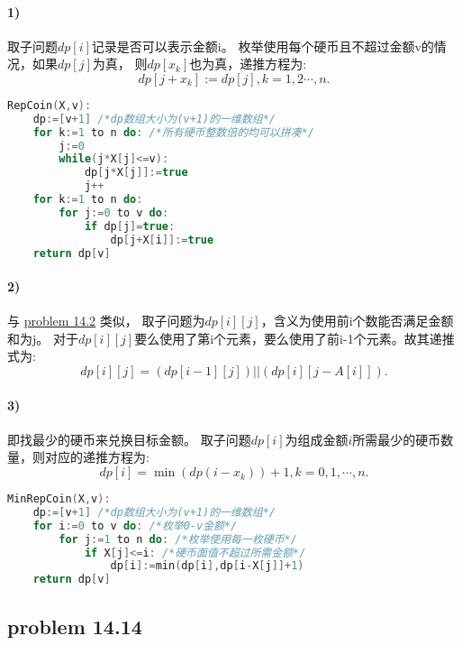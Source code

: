 \documentclass[11pt,a4paper,oneside,oldfontcommands]{ctexart}
\begin{document}
\paragraph*{1)}取子问题$dp[i]$记录是否可以表示金额i。
枚举使用每个硬币且不超过金额v的情况，如果$dp[j]$为真，
则$dp[x_k]$也为真，递推方程为:
$$dp[j+x_k]:=dp[j],k=1,2\cdots,n.$$
\begin{lstlisting}[language=C++,title=RepCoin.func]
RepCoin(X,v):
	dp:=[v+1] /*dp数组大小为(v+1)的一维数组*/
	for k:=1 to n do: /*所有硬币整数倍的均可以拼凑*/
		j:=0
		while(j*X[j]<=v):
			dp[j*X[j]]:=true
			j++
	for k:=1 to n do:
		for j:=0 to v do:
			if dp[j]=true:
				dp[j+X[i]]:=true
	return dp[v]
\end{lstlisting}
\paragraph*{2)}
与 \hyperlink{14.2}{problem 14.2} 类似，
取子问题为$dp[i][j]$，含义为使用前i个数能否满足金额和为j。
对于$dp[i][j]$要么使用了第i个元素，要么使用了前i-1个元素。故其递推式为:
$$dp[i][j]=(dp[i-1][j])||(dp[i][j-A[i]]).$$
\paragraph*{3)}即找最少的硬币来兑换目标金额。
取子问题$dp[i]$为组成金额$i$所需最少的硬币数量，则对应的递推方程为:
$$dp[i]=\min(dp(i-x_k))+1,k=0,1,\cdots,n.$$
\begin{lstlisting}[language=C++,title=MinRepCoin.func]
MinRepCoin(X,v):
	dp:=[v+1] /*dp数组大小为(v+1)的一维数组*/
	for i:=0 to v do: /*枚举0-v金额*/
		for j:=1 to n do: /*枚举使用每一枚硬币*/
			if X[j]<=i: /*硬币面值不超过所需金额*/
				dp[i]:=min(dp[i],dp[i-X[j]]+1)
	return dp[v]
\end{lstlisting}
{\subsection*{problem 14.14}}
\end{document}

